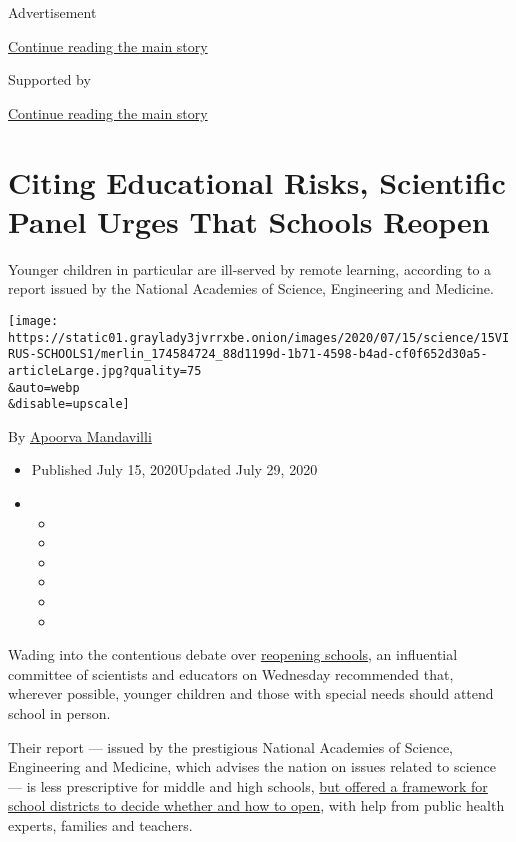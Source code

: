Advertisement

\protect\hyperlink{after-top}{Continue reading the main story}

Supported by

\protect\hyperlink{after-sponsor}{Continue reading the main story}

\hypertarget{citing-educational-risks-scientific-panel-urges-that-schools-reopen}{%
\section{Citing Educational Risks, Scientific Panel Urges That Schools
Reopen}\label{citing-educational-risks-scientific-panel-urges-that-schools-reopen}}

Younger children in particular are ill-served by remote learning,
according to a report issued by the National Academies of Science,
Engineering and Medicine.

\texttt{[image: https://static01.graylady3jvrrxbe.onion/images/2020/07/15/science/15VIRUS-SCHOOLS1/merlin\_174584724\_88d1199d-1b71-4598-b4ad-cf0f652d30a5-articleLarge.jpg?quality=75\\\&auto=webp\\\&disable=upscale]}

By
\href{https://www.nytimes3xbfgragh.onion/by/apoorva-mandavilli}{Apoorva
Mandavilli}

\begin{itemize}
\item
  Published July 15, 2020Updated July 29, 2020
\item
  \begin{itemize}
  \item
  \item
  \item
  \item
  \item
  \item
  \end{itemize}
\end{itemize}

Wading into the contentious debate over
\href{https://www.nytimes3xbfgragh.onion/2020/07/29/magazine/schools-reopening-covid.html}{reopening
schools}, an influential committee of scientists and educators on
Wednesday recommended that, wherever possible, younger children and
those with special needs should attend school in person.

Their report --- issued by the prestigious National Academies of
Science, Engineering and Medicine, which advises the nation on issues
related to science --- is less prescriptive for middle and high schools,
\href{https://www.nationalacademies.org/news/2020/07/schools-should-prioritize-reopening-in-fall-2020-especially-for-grades-k-5-while-weighing-risks-and-benefits}{but
offered a framework for school districts to decide whether and how to
open}, with help from public health experts, families and teachers.

